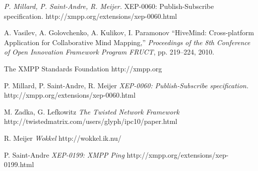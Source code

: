 \newpage
{}
\begin{thebibliography}{99}
\textit {P. Millard, P. Saint-Andre, R. Meijer.} XEP-0060: Publish-Subscribe
specification. http://xmpp.org/extensions/xep-0060.html

A. Vasilev, A. Golovchenko, A. Kulikov, I. Paramonov
``HiveMind: Cross-platform Application for Collaborative Mind Mapping,''
\emph{Proceedings of the 8th Conference of Open Innovation Framework
  Program FRUCT}, pp. 219--224, 2010.

 The XMPP Standards Foundation http://xmpp.org

 P. Millard, P. Saint-Andre, R. Meijer \emph{XEP-0060:
    Publish-Subscribe specification.} http://xmpp.org/extensions/xep-0060.html

 M. Zadka, G. Lefkowitz \emph{The Twisted Network Framework}
  http://twistedmatrix.com/users/glyph/ipc10/paper.html

 R. Meijer \emph{Wokkel} http://wokkel.ik.nu/

 P. Saint-Andre \emph{XEP-0199: XMPP Ping}
http://xmpp.org/extensions/xep-0199.html

\end{thebibliography}